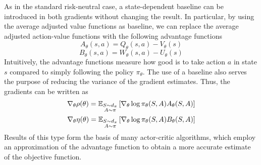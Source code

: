 As in the standard risk-neutral case, a state-dependent baseline can be 
introduced in both gradients without changing the result. In particular, by 
using the average adjusted value functions as baseline, we can replace the 
average adjusted action-value functions with the following advantage functions
\begin{equation}
	A_\theta(s,a) = Q_\theta(s,a) - V_\theta(s)
\end{equation}
\begin{equation}
	B_\theta(s,a) = W_\theta(s,a) - U_\theta(s)
\end{equation}
Intuitively, the advantage functions measure how good is to take action $a$ in
state $s$ compared to simply following the policy $\pi_\theta$. The use of a
baseline also serves the purpose of reducing the variance of the gradient
estimates. Thus, the gradients can be written as 
\begin{equation}\label{eq:pg_advantage_Q}
	\nabla_\theta \rho(\theta) = \E[\substack{S\sim d_\pi \\ 
A \sim \pi}]{\nabla_\theta \log \pi_\theta(S,A) A_\theta(S,A)}
\end{equation}
\begin{equation}\label{eq:pg_advantage_W}
	\nabla_\theta \eta(\theta) = \E[\substack{S\sim d_\pi \\ 
A \sim \pi}]{\nabla_\theta \log \pi_\theta(S,A) B_\theta(S,A)}
\end{equation}
Results of this type form the basis of many actor-critic algorithms, which
employ an approximation of the advantage function to obtain a more accurate
estimate of the objective function. 

